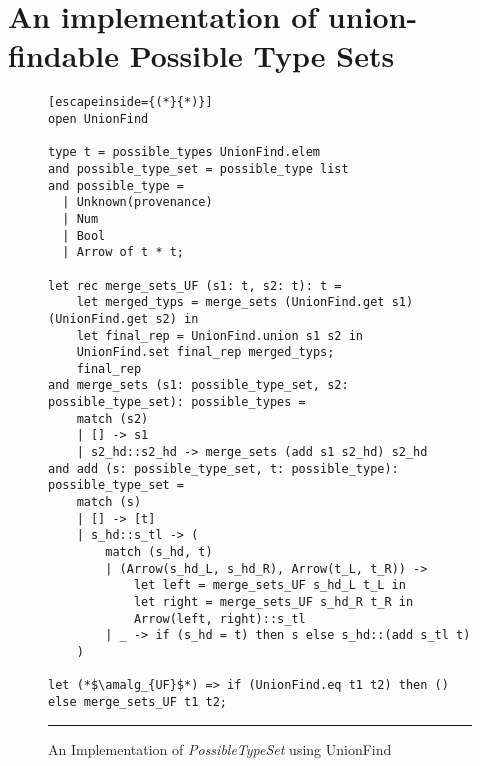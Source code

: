 \newpage
\section{An implementation of union-findable Possible Type Sets}

\begin{figure}[h!]
\begin{lstlisting}[escapeinside={(*}{*)}]
open UnionFind

type t = possible_types UnionFind.elem
and possible_type_set = possible_type list
and possible_type =
  | Unknown(provenance)
  | Num
  | Bool
  | Arrow of t * t;

let rec merge_sets_UF (s1: t, s2: t): t =
    let merged_typs = merge_sets (UnionFind.get s1) (UnionFind.get s2) in
    let final_rep = UnionFind.union s1 s2 in
    UnionFind.set final_rep merged_typs;
    final_rep
and merge_sets (s1: possible_type_set, s2: possible_type_set): possible_types = 
    match (s2)
    | [] -> s1
    | s2_hd::s2_hd -> merge_sets (add s1 s2_hd) s2_hd
and add (s: possible_type_set, t: possible_type): possible_type_set =
    match (s)
    | [] -> [t]
    | s_hd::s_tl -> (
        match (s_hd, t)
        | (Arrow(s_hd_L, s_hd_R), Arrow(t_L, t_R)) ->
            let left = merge_sets_UF s_hd_L t_L in
            let right = merge_sets_UF s_hd_R t_R in
            Arrow(left, right)::s_tl
        | _ -> if (s_hd = t) then s else s_hd::(add s_tl t)
    )

let (*$\amalg_{UF}$*) => if (UnionFind.eq t1 t2) then () else merge_sets_UF t1 t2;

\end{lstlisting}
\vspace{-4px}
 \hrule
\caption{An Implementation of \textit{PossibleTypeSet} using UnionFind}
\label{fig:ufalgcode}
\end{figure}
